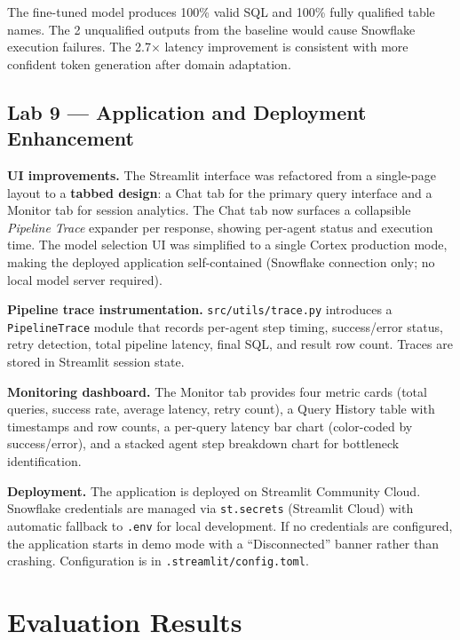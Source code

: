 \documentclass[11pt,letterpaper]{article}
\begin{document}
The fine-tuned model produces 100\% valid SQL and 100\% fully qualified table names. The 2 unqualified outputs from the baseline would cause Snowflake execution failures. The 2.7$\times$ latency improvement is consistent with more confident token generation after domain adaptation.

\subsection{Lab 9 --- Application and Deployment Enhancement}

\textbf{UI improvements.} The Streamlit interface was refactored from a single-page layout to a \textbf{tabbed design}: a Chat tab for the primary query interface and a Monitor tab for session analytics. The Chat tab now surfaces a collapsible \emph{Pipeline Trace} expander per response, showing per-agent status and execution time. The model selection UI was simplified to a single Cortex production mode, making the deployed application self-contained (Snowflake connection only; no local model server required).

\textbf{Pipeline trace instrumentation.} \texttt{src/utils/trace.py} introduces a \texttt{PipelineTrace} module that records per-agent step timing, success/error status, retry detection, total pipeline latency, final SQL, and result row count. Traces are stored in Streamlit session state.

\textbf{Monitoring dashboard.} The Monitor tab provides four metric cards (total queries, success rate, average latency, retry count), a Query History table with timestamps and row counts, a per-query latency bar chart (color-coded by success/error), and a stacked agent step breakdown chart for bottleneck identification.

\textbf{Deployment.} The application is deployed on Streamlit Community Cloud. Snowflake credentials are managed via \texttt{st.secrets} (Streamlit Cloud) with automatic fallback to \texttt{.env} for local development. If no credentials are configured, the application starts in demo mode with a ``Disconnected'' banner rather than crashing. Configuration is in \texttt{.streamlit/config.toml}.

\section{Evaluation Results}
\end{document}
